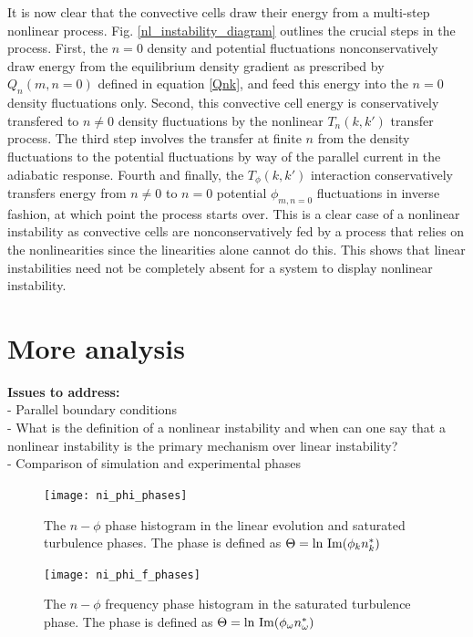 \documentclass[12pt]{article}
\begin{document}
It is now clear that the convective cells draw their energy from a multi-step nonlinear process. Fig. \ref{nl_instability_diagram} outlines the crucial steps in the process. 
First, the $n=0$ density and potential fluctuations nonconservatively draw energy from the equilibrium density gradient as prescribed by $Q_n(m,n=0)$ defined in equation \ref{Qnk}, and feed
this energy into the $n=0$ density fluctuations only. Second, this
convective cell energy is conservatively transfered to $n \ne 0$ density fluctuations by the nonlinear $T_n(k,k')$ transfer process. The third step involves the transfer at finite $n$ from the density
fluctuations to the potential fluctuations by way of the parallel current in the adiabatic response. Fourth and finally, the $T_\phi(k,k')$ interaction conservatively transfers energy from
$n \ne 0$ to $n=0$ potential $\phi_{m,n=0}$ fluctuations in inverse fashion, at which point the process starts over. This is a clear case of a nonlinear instability as convective cells
are nonconservatively fed by a process that relies on the nonlinearities since the linearities alone cannot do this. This shows that linear instabilities need not be completely absent 
for a system to display nonlinear instability. \\


\section{More analysis}

{\bf Issues to address:} \\
- Parallel boundary conditions \\
- What is the definition of a nonlinear instability and when can one say that a nonlinear instability is the primary mechanism over linear instability? \\
- Comparison of simulation and experimental phases \\


\begin{figure}
\texttt{[image: ni\_phi\_phases]}
\hfil
\caption{The $n-\phi$ phase histogram in the linear evolution and saturated turbulence phases. The phase is defined as $\Theta = {\rm ln \ Im} (\phi_k n_k^*)$}
\label{ni_phi_m_phases}
\end{figure}

\begin{figure}
\texttt{[image: ni\_phi\_f\_phases]}
\hfil
\caption{The $n-\phi$ frequency phase histogram in the saturated turbulence phase. The phase is defined as $\Theta = {\rm ln \ Im} (\phi_\omega n_\omega^*)$}
\label{ni_phi_f_phases}
\end{figure}
\end{document}
